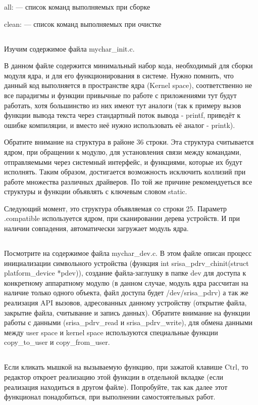 all: — список команд выполняемых при сборке 

clean: — список команд выполняемых при очистке

\subsection{}Изучим содержимое файла mychar\_init.c.

В данном файле содержится минимальный набор кода, необходимый для сборки модуля ядра, и для его функционирования в системе. Нужно помнить, что данный код выполняется в пространстве ядра (Kernel space), соответственно не все парадигмы и функции привычные по работе с приложениями тут будут работать, хотя большинство из них имеют тут аналоги (так к примеру вызов функции вывода текста через стандартный поток вывода - printf, приведёт к ошибке компиляции, и вместо неё нужно использовать её аналог - printk).

Обратите внимание на структура в районе 36 строки. Эта структура считывается ядром, при обращении к модулю, для установления связи между командами, отправляемыми через системный интерфейс, и функциями, которые их будут исполнять. Таким образом, достигается возможность исключить коллизий при работе множества различных драйверов. По той же причине рекомендуеться  все структуры и функции объявлять с ключевым словом static.

Следующий момент, это структура объявляемая со строки 25. Параметр .compatible используется ядром, при сканировании дерева устройств. И при наличии совпадения, автоматически загружает модуль ядра.  

\subsection{}Посмотрите на содержимое файла mychar\_dev.c. В этом файле описан процесс инициализации символьного устройства (функция int srisa\_pdrv\_chinit(struct platform\_device *pdev)), создание файла-заглушку в папке dev для доступа к конкретному аппаратному модулю (в данном случае, модуль ядра рассчитан на наличие только одного объекта, файл доступа будет /dev/srisa\_pdrv) а так же реализация API вызовов, адресованных данному устройству (открытие файла, закрытие файла, считывание и запись данных).
Обратите внимание на функции работы с данными (srisa\_pdrv\_read и srisa\_pdrv\_write), для обмена данными между user space и kernel space используются специальные функции copy\_to\_user и copy\_from\_user.

\subsection{}Если кликать мышкой на вызываемую функцию, при зажатой клавише Ctrl, то редактор откроет реализацию этой функции в отдельной вкладке (если реализация находиться в другом файле). Попробуйте, так как далее этот функционал понадобиться, при выполнении самостоятельных работ.

